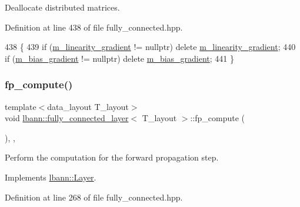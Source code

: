 Deallocate distributed matrices. 

Definition at line 438 of file fully\+\_\+connected.\+hpp.


\begin{DoxyCode}
438                              \{
439     \textcolor{keywordflow}{if} (\hyperlink{classlbann_1_1fully__connected__layer_ab80f9cb94662ce4d90aa6d8b5cfa0803}{m\_linearity\_gradient} != \textcolor{keyword}{nullptr}) \textcolor{keyword}{delete} 
      \hyperlink{classlbann_1_1fully__connected__layer_ab80f9cb94662ce4d90aa6d8b5cfa0803}{m\_linearity\_gradient};
440     \textcolor{keywordflow}{if} (\hyperlink{classlbann_1_1fully__connected__layer_a6510917c573378f40789a1d16db22b4e}{m\_bias\_gradient} != \textcolor{keyword}{nullptr}) \textcolor{keyword}{delete} \hyperlink{classlbann_1_1fully__connected__layer_a6510917c573378f40789a1d16db22b4e}{m\_bias\_gradient};
441   \}
\end{DoxyCode}
\mbox{\label{classlbann_1_1fully__connected__layer_a6dac6598c6b4ad3f766c5f0e88035f10}} 
\subsubsection{\texorpdfstring{fp\+\_\+compute()}{fp\_compute()}}
{\footnotesize\ttfamily template$<$data\+\_\+layout T\+\_\+layout$>$ \\
void \hyperlink{classlbann_1_1fully__connected__layer}{lbann\+::fully\+\_\+connected\+\_\+layer}$<$ T\+\_\+layout $>$\+::fp\+\_\+compute (\begin{DoxyParamCaption}{ }\end{DoxyParamCaption})\hspace{0.3cm}{\ttfamily [inline]}, {\ttfamily [override]}, {\ttfamily [virtual]}}

Perform the computation for the forward propagation step. 

Implements \hyperlink{classlbann_1_1Layer_a523319dd1bd87a0612afa1912bb5aad7}{lbann\+::\+Layer}.



Definition at line 268 of file fully\+\_\+connected.\+hpp.


